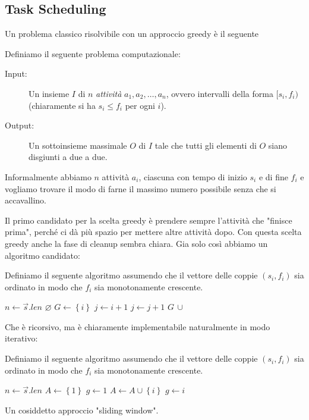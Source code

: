 \documentclass[11pt]{scrartcl}
\begin{document}
	\subsection{Task Scheduling}
	Un problema classico risolvibile con un approccio greedy è il seguente
	\begin{problem}
		Definiamo il seguente problema computazionale:
		\begin{description}
			\item[Input:] Un insieme  $I$ di $n$ \textit{attività} $a_1,a_2,\dots,a_n$, ovvero intervalli della forma $[s_i,f_i)$ (chiaramente si ha $s_i\le f_i$ per ogni $i$).
			\item[Output:] Un sottoinsieme massimale $O$ di $I$ tale che tutti gli elementi di $O$ siano disgiunti a due a due.
		\end{description}
		Informalmente abbiamo $n$ attività $a_i$, ciascuna con tempo di inizio $s_i$ e di fine $f_i$ e vogliamo trovare il modo di farne il massimo numero possibile senza che si accavallino.
	\end{problem}
	Il primo candidato per la scelta greedy è prendere sempre l'attività che "finisce prima", perché ci dà più spazio per mettere altre attività dopo. Con questa scelta greedy anche la fase di cleanup sembra chiara. Gia solo così abbiamo un algoritmo candidato:
	\begin{algorithm}
		Definiamo il seguente algoritmo assumendo che il vettore delle coppie $(s_i,f_i)$ sia ordinato in modo che $f_i$ sia monotonamente crescente.
		\begin{algorithmic}[1]
				\State $n\gets \vec{s}.len$ 
				\State \Return $\varnothing$
				\EndIf
				\State $G\gets\left\{i\right\}$ 
				\State $j\gets i+1$ 
				 
					\State $j\gets j+1$
				\EndWhile
				\State \Return $G\,\cup\,$
			\EndFunction
		\end{algorithmic}
		
	\end{algorithm}
	Che è ricorsivo, ma è chiaramente implementabile naturalmente in modo iterativo:
	\begin{algorithm}
		Definiamo il seguente algoritmo assumendo che il vettore delle coppie $(s_i,f_i)$ sia ordinato in modo che $f_i$ sia monotonamente crescente. 
		\begin{algorithmic}[1]
				\State $n\gets \vec{s}.len$ 
				\State $A\gets\left\{1\right\}$
				\State $g\gets 1$
						\State $A\gets A\cup \left\{i\right\}$ 
						\State $g\gets i$
					\EndIf
				\EndFor
			\EndFunction
		\end{algorithmic}
		Un cosiddetto approccio "sliding window".
	\end{algorithm}
\end{document}
